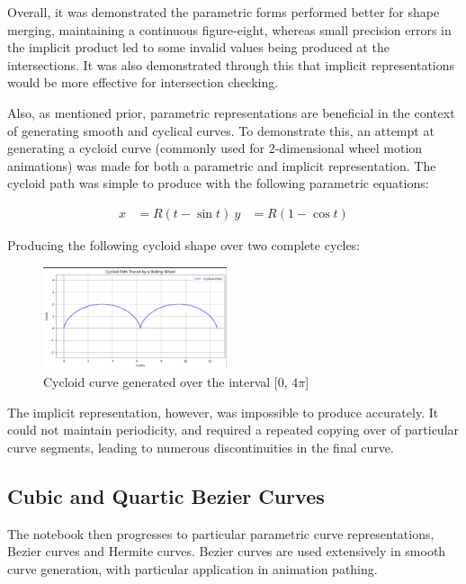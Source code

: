 \documentclass[10pt,a4paper]{article}
\begin{document}
Overall, it was demonstrated the parametric forms performed better for shape merging, maintaining a continuous figure-eight, whereas small precision errors in the implicit product led to some invalid values being produced at the intersections. It was also demonstrated through this that implicit representations would be more effective for intersection checking.

Also, as mentioned prior, parametric representations are beneficial in the context of generating smooth and cyclical curves. To demonstrate this, an attempt at generating a cycloid curve (commonly used for 2-dimensional wheel motion animations) was made for both a parametric and implicit representation. The cycloid path was simple to produce with the following parametric equations:

\begin{equation}
\begin{aligned}
x &= R(t - \sin t) \
y &= R(1 - \cos t)
\end{aligned}
\end{equation}

Producing the following cycloid shape over two complete cycles:

\begin{figure}[H]
\centering
\includegraphics[width=0.48\textwidth]{VisualComputingReportResults/CycloidShape}
\caption{Cycloid curve generated over the interval [0, $4\pi$]}
\label{fig:your_label}
\end{figure}

The implicit representation, however, was impossible to produce accurately. It could not maintain periodicity, and required a repeated copying over of particular curve segments, leading to numerous discontinuities in the final curve.

\subsection{Cubic and Quartic Bezier Curves}

The notebook then progresses to particular parametric curve representations, Bezier curves and Hermite curves. Bezier curves are used extensively in smooth curve generation, with particular application in animation pathing. 
\end{document}
